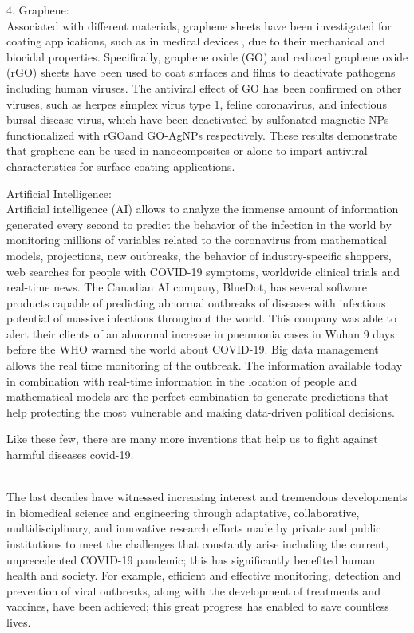 \documentclass[12pt]{article}
\begin{document}
4. Graphene:
\\
Associated with different materials, graphene sheets have been investigated for coating applications, such as in medical devices , due to their mechanical and biocidal properties. Specifically, graphene oxide (GO) and reduced graphene oxide (rGO) sheets have been used to coat surfaces and films to deactivate pathogens including human viruses. The antiviral effect of GO has been confirmed on other viruses, such as herpes simplex virus type 1, feline coronavirus, and infectious bursal disease virus, which have been deactivated by sulfonated magnetic NPs functionalized with rGOand GO-AgNPs respectively. These results demonstrate that graphene can be used in nanocomposites or alone to impart antiviral characteristics for surface coating applications.

\indent

{\large Artificial Intelligence:}
\\
Artificial intelligence (AI) allows to analyze the immense amount of information generated every second to predict the behavior of the infection in the world by monitoring millions of variables related to the coronavirus from mathematical models, projections, new outbreaks, the behavior of industry-specific shoppers, web searches for people with COVID-19 symptoms, worldwide clinical trials and real-time news. The Canadian AI company, BlueDot, has several software products capable of predicting abnormal outbreaks of diseases with infectious potential of massive infections throughout the world. This company was able to alert their clients of an abnormal increase in pneumonia cases in Wuhan 9 days before the WHO warned the world about COVID-19. Big data management allows the real time monitoring of the outbreak. The information available today in combination with real-time information in the location of people and mathematical models are the perfect combination to generate predictions that help protecting the most vulnerable and making data-driven political decisions.

\indent

Like these few, there are many more inventions that help us to fight against harmful diseases covid-19.

\\
The last decades have witnessed increasing interest and tremendous developments in biomedical science and engineering through adaptative, collaborative, multidisciplinary, and innovative research efforts made by private and public institutions to meet the challenges that constantly arise including the current, unprecedented COVID-19 pandemic; this has significantly benefited human health and society. For example, efficient and effective monitoring, detection and prevention of viral outbreaks, along with the development of treatments and vaccines, have been achieved; this great progress has enabled to save countless lives.
\end{document}
